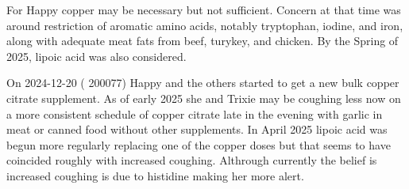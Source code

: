 {For Happy copper may be necessary but not sufficient. 
Concern at that time was  around restriction of aromatic amino
acids, notably tryptophan, iodine, and iron, along with
adequate meat fats from beef, turykey, and chicken. 
By the Spring of 2025, lipoic acid was also considered. 

On 2024-12-20 ( 200077) Happy and the others started to get a 
new bulk copper citrate supplement. 
As of early 2025 she and Trixie  may be coughing less now on a more consistent
schedule of copper citrate late in the evening with garlic in meat or canned
food without other supplements. In April 2025 lipoic acid was begun more
regularly replacing one of the copper doses but that seems to have coincided
roughly with increased coughing. Althrough currently the belief is 
increased coughing is due to histidine making her more alert.

 




} %


